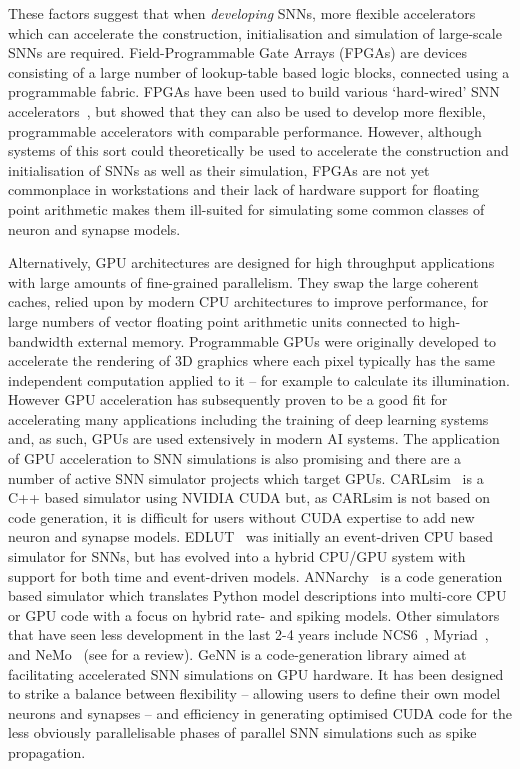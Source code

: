 \documentclass[utf8]{frontiersSCNS} %
\begin{document}
These factors suggest that when \textit{developing} SNNs, more flexible accelerators which can accelerate the construction, initialisation and simulation of large-scale SNNs are required.
Field-Programmable Gate Arrays (FPGAs) are devices consisting of a large number of lookup-table based logic blocks, connected using a programmable fabric.
FPGAs have been used to build various `hard-wired' SNN accelerators~\citep{Moore2012,Wang2018}, but \citet{Naylor2013} showed that they can also be used to develop more flexible, programmable accelerators with comparable performance.
However, although systems of this sort could theoretically be used to accelerate the construction and initialisation of SNNs as well as their simulation, FPGAs are not yet commonplace in workstations and their lack of hardware support for floating point arithmetic makes them ill-suited for simulating some common classes of neuron and synapse models. 

Alternatively, GPU architectures are designed for high throughput applications with large amounts of fine-grained parallelism.
They swap the large coherent caches, relied upon by modern CPU architectures to improve performance, for large numbers of vector floating point arithmetic units connected to high-bandwidth external memory. 
Programmable GPUs were originally developed to accelerate the rendering of 3D graphics where each pixel typically has the same independent computation applied to it -- for example to calculate its illumination.
However GPU acceleration has subsequently proven to be a good fit for accelerating many applications including the training of deep learning systems and, as such, GPUs are used extensively in modern AI systems. 
The application of GPU acceleration to SNN simulations is also promising and there are a number of active SNN simulator projects which target GPUs. 
CARLsim~\citep{Chou2018} is a C++ based simulator using NVIDIA CUDA but, as CARLsim is not based on code generation, it is difficult for users without CUDA expertise to add new neuron and synapse models.
EDLUT~\citep{Garrido2011} was initially an event-driven CPU based simulator for SNNs, but has evolved into a hybrid CPU/GPU system with support for both time and event-driven models.
ANNarchy~\citep{Vitay2015} is a code generation based simulator which translates Python model descriptions into multi-core CPU or GPU code with a focus on hybrid rate- and spiking models.
Other simulators that have seen less development in the last 2-4 years include NCS6~\citep{Hoang2013}, Myriad~\citep{Rittner2016}, and NeMo~\citep{Fidjeland2009} (see \citet{Brette2012} for a review).
GeNN \citep{Yavuz2016} is a code-generation library aimed at facilitating accelerated SNN simulations on GPU hardware.
It has been designed to strike a balance between flexibility -- allowing users to define their own model neurons and synapses -- and efficiency in generating optimised CUDA code for the less obviously parallelisable phases of parallel SNN simulations such as spike propagation.
\end{document}
